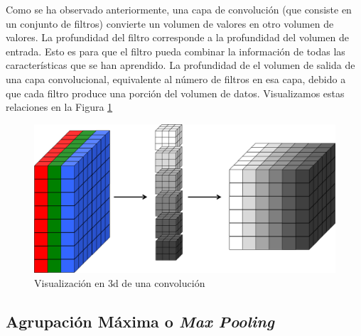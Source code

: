 	Como se ha observado anteriormente, una capa de convolución (que consiste en un conjunto de filtros) convierte un volumen de valores en otro volumen de valores. La profundidad del filtro corresponde a la profundidad del volumen de entrada. Esto es para que el filtro pueda combinar la información de todas las características que se han aprendido. La profundidad de el volumen de salida de una capa convolucional, equivalente al número de filtros en esa capa, debido a que cada filtro produce una porción del volumen de datos. Visualizamos estas relaciones en la Figura \ref{fig:conv_depth}
	\begin{figure}[htp]
        \centering
        \includegraphics[scale=0.3]{chapter3/conv_depth.png}
        \caption{Visualización en 3d de una convolución}
        \label{fig:conv_depth}
    \end{figure}


    \subsection{Agrupación Máxima o \textit{Max Pooling}}

